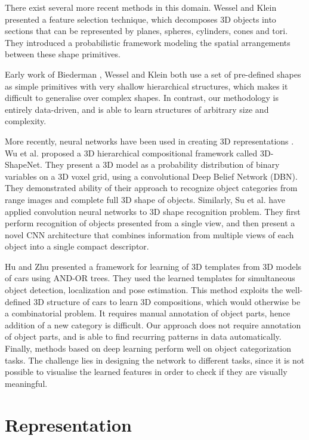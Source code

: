 \documentclass[runningheads]{llncs}
\begin{document}
There exist several more recent methods in this domain. Wessel and
Klein \cite{pratikakis2010learning} presented a feature selection
technique, which decomposes 3D objects into sections that can be
represented by planes, spheres, cylinders, cones and tori.
They introduced a probabilistic framework modeling the spatial
arrangements between these shape primitives.

Early work of Biederman \cite{biederman1987recognition}, Wessel and Klein \cite{pratikakis2010learning} both use a set of pre-defined shapes as simple primitives with very shallow hierarchical structures, which makes it difficult to generalise over complex shapes. In contrast, our methodology is entirely data-driven, and is able to learn structures of arbitrary size and complexity. 

More recently, neural networks have been used in creating 3D representations \cite{wu20153d,Su_2015_ICCV}. Wu et al. \cite{wu20153d} proposed a 3D hierarchical compositional
framework called 3D-ShapeNet. They present a 3D model
as a probability distribution of binary variables on a 3D voxel
grid, using a convolutional Deep Belief Network (DBN). They demonstrated
ability of their approach to recognize object categories from range
images and complete full 3D shape of objects. Similarly, Su et al. \cite{Su_2015_ICCV} have applied convolution neural
networks to 3D shape recognition problem. They first perform recognition
of objects presented from a single view, and then present a novel
CNN architecture that combines information from multiple views of each object into a single compact descriptor.

Hu and Zhu \cite{hu2015learning} presented a framework for learning
of 3D templates from 3D models of cars using AND-OR trees. They used
the learned templates for simultaneous object detection,
localization and pose estimation. This method exploits the well-defined 3D structure of cars to learn 3D compositions, which would otherwise be a combinatorial problem. It requires manual annotation of object parts, hence addition of a new category is difficult. Our approach does not require annotation of object parts, and is able to find recurring patterns in data automatically. Finally, methods based on deep learning \cite{wu20153d,Su_2015_ICCV} perform well on object categorization tasks. The challenge lies in designing the network to different tasks, since it is not possible to visualise the learned features in order to check if they are visually meaningful. 

\section{Representation\label{sec:Representation}}
\end{document}
